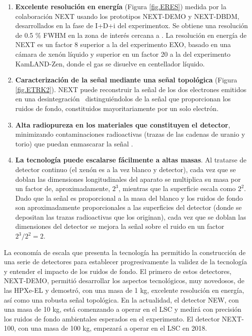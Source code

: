 \begin{enumerate}
\item {\bf Excelente resolución en energía} (Figura \ref{fig.ERES}) medida por la colaboración NEXT usando los prototipos NEXT-DEMO y NEXT-DBDM, desarrollados en la fase de I+D+i del experimentox. Se obtiene una resolución de 0.5 \% FWHM en la zona de interés cercana a \Qbb. La resolución en energía de NEXT es un factor 8 superior a la del experimento EXO, basado en una cámara de xenón líquido y superior en un factor 20 a la del experimento KamLAND-Zen, donde el gas se disuelve en centellador líquido. 
\item {\bf Caracterización de la señal mediante una señal topológica} (Figura \ref{fig.ETRK2}). NEXT puede reconstruir la señal de los dos electrones emitidos en una desintegración \bb\, distinguiéndolos de la señal que proporcionan los ruidos de fondo, constituidos mayoritariamente por un solo electrón.
\item {\bf Alta radiopureza en los materiales que constituyen el detector}, minimizando contaminaciones radioactivas (trazas de las cadenas de uranio y torio) que puedan enmascarar la señal \bbonu.
\item {\bf La tecnología puede escalarse fácilmente a altas masas}. Al tratarse de detector continuo (el xenón es a la vez blanco y detector), cada vez que se doblan las dimensiones longitudinales del aparato se multiplica su masa por un factor de, aproximadamente, $2^3$, mientras que la superficie escala como $2^2$. Dado que la señal es proporcional a la masa del blanco y los ruidos de fondo son aproximadamente proporcionales a las superficies del detector (donde se depositan las trazas radioactivas que los originan), cada vez que se doblan las dimensiones del detector se mejora la señal sobre el ruido en un factor $2^3/2^2 = 2$. 
\end{enumerate}

La economía de escala que presenta la tecnología  ha permitido la construcción de una serie de detectores para establecer progresivamente la validez de la tecnología y entender el impacto de los ruidos de fondo. El primero de estos detectores, NEXT-DEMO, permitió desarrollar los aspectos tecnológicos, muy novedosos, de las HPXe-EL y demostró, con una masa de 1 kg, excelente resolución en energía, así como una robusta señal topológica. En la actualidad, el detector NEW, con una masa de 10 kg, está comenzando a operar en el LSC y medirá con precisión los ruidos de fondo ambientales esperados en el experimento. El detector NEXT-100, con una masa de 100 kg, empezará a operar en el LSC en 2018. 


